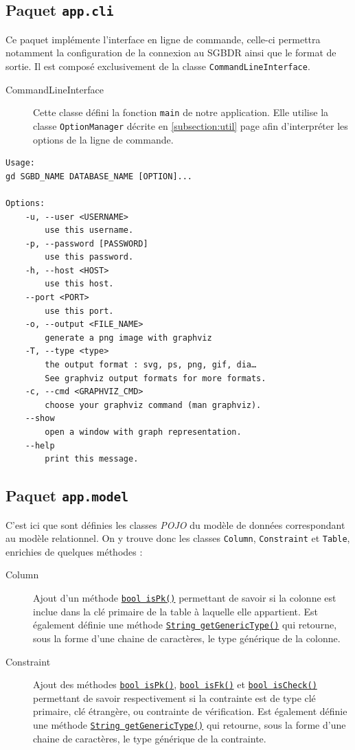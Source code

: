 \subsection{Paquet \texttt{app.cli}}

Ce paquet implémente l'interface en ligne de commande, celle-ci permettra notamment la configuration de la connexion au SGBDR ainsi que le format de sortie. Il est composé exclusivement de la classe \texttt{CommandLineInterface}.

\begin{description}
\item[CommandLineInterface] Cette classe défini la fonction \texttt{main} de notre application. Elle utilise la classe \texttt{OptionManager} décrite en \ref{subsection:util} page \pageref{subsection:util} afin d'interpréter les options de la ligne de commande.  
\end{description}

\begin{verbatim}
Usage:
gd SGBD_NAME DATABASE_NAME [OPTION]...

Options:
    -u, --user <USERNAME>
        use this username.
    -p, --password [PASSWORD]
        use this password.
    -h, --host <HOST>
        use this host.
    --port <PORT>
        use this port.
    -o, --output <FILE_NAME>
        generate a png image with graphviz
    -T, --type <type>
        the output format : svg, ps, png, gif, dia… 
        See graphviz output formats for more formats.
    -c, --cmd <GRAPHVIZ_CMD>
        choose your graphviz command (man graphviz).
    --show 
        open a window with graph representation.
    --help
        print this message.
\end{verbatim}


\subsection{Paquet \texttt{app.model}}
C'est ici que sont définies les classes \emph{POJO} du modèle de données correspondant au modèle relationnel. On y trouve donc les classes \texttt{Column}, \texttt{Constraint} et \texttt{Table}, enrichies de quelques méthodes :

\begin{description}

\item[Column] Ajout d'un méthode \texttt{\underline{bool isPk()}} permettant de savoir si la colonne est inclue dans la clé primaire de la table à laquelle elle appartient. Est également définie une méthode \texttt{\underline{String getGenericType()}} qui retourne, sous la forme d'une chaine de caractères, le type générique de la colonne.

\item[Constraint] Ajout des méthodes \texttt{\underline{bool isPk()}}, \texttt{\underline{bool isFk()}} et \texttt{\underline{bool isCheck()}} permettant de savoir respectivement si la contrainte est de type clé primaire, clé étrangère, ou contrainte de vérification. Est également définie une méthode \texttt{\underline{String getGenericType()}} qui retourne, sous la forme d'une chaine de caractères, le type générique de la contrainte.
\end{description}

